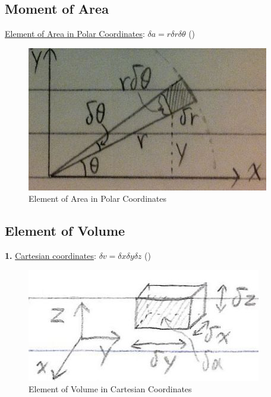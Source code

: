 \documentclass[12pt]{article}
\begin{document}
\begin{flushleft}
	\subsection{Moment of Area}
	
	\uline{Element of Area in Polar Coordinates}: $\delta a = r \delta r \delta \theta $ () \linebreak 
	
	\begin{figure}[H]
	\centering
	\includegraphics[scale=0.8]{polarElementOfArea}
	\caption{Element of Area in Polar Coordinates}
	\label{fig:polarElementOfArea}
	\end{figure}
	
	\subsection{Element of Volume} 
	
	\textbf{1.} \uline{Cartesian coordinates}: $\displaystyle \delta v = \delta x \delta y \delta z $ \linebreak () \linebreak 
	
	\begin{figure}[H]
	\centering
	\includegraphics[scale=2]{cartesianMomentOfVolume}
	\caption{Element of Volume in Cartesian Coordinates}
	\label{fig:cartesianMomentOfVolume}
	\end{figure}
	

\end{flushleft}
\end{document}
